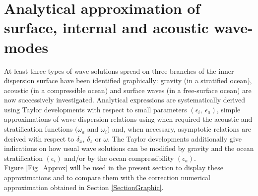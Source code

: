 \documentclass[a4paper,11pt]{article}
\begin{document}
\newpage
\section{Analytical approximation of surface, internal and acoustic wave-modes}
\label{SectionAnalyticalSol}

At least three types of wave solutions spread on three branches of the inner dispersion surface have been identified graphically: gravity (in a stratified ocean), acoustic (in a compressible ocean) and surface waves (in a free-surface ocean) are now successively investigated. Analytical expressions are systematically derived using Taylor developments with respect to small parameters $(\epsilon_i,\ \epsilon_a)$, simple approximations of wave dispersion relations using when required the acoustic and stratification functions $(\omega_a$ and $\omega_i)$ and, when necessary, asymptotic relations are derived with respect to $\delta_x$, $\delta_z$ or $\omega$. The Taylor developments additionally give indications on how usual wave solutions can be modified by gravity and the ocean stratification $(\epsilon_i)$ and/or by the ocean compressibility $(\epsilon_a)$.\\
Figure \ref{Fig_Approx} will be used in the present section to display these approximations and to compare them with the correction numerical approximation obtained in Section \ref{SectionGraphic}.
\end{document}
